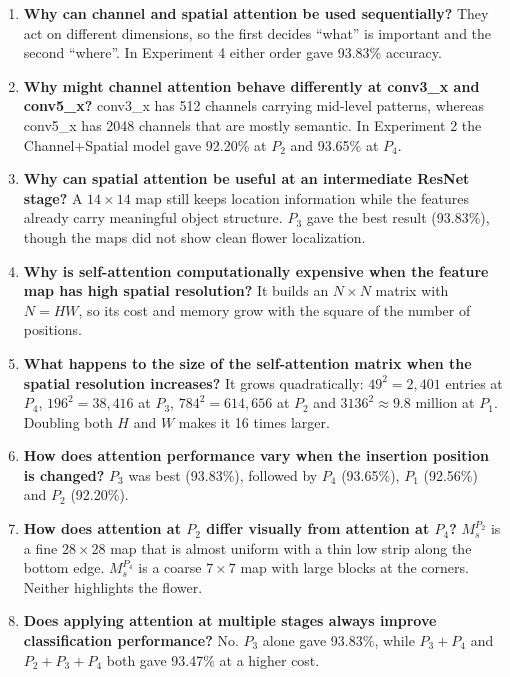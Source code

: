 \documentclass[11pt]{article}
\begin{document}
\begin{enumerate}
\item \textbf{Why can channel and spatial attention be used sequentially?}
They act on different dimensions, so the first decides ``what'' is
important and the second ``where''. In Experiment 4 either order gave
93.83\% accuracy.

\item \textbf{Why might channel attention behave differently at conv3\_x and conv5\_x?}
conv3\_x has 512 channels carrying mid-level patterns, whereas conv5\_x has
2048 channels that are mostly semantic. In Experiment 2 the Channel+Spatial
model gave 92.20\% at $P_2$ and 93.65\% at $P_4$.

\item \textbf{Why can spatial attention be useful at an intermediate ResNet stage?}
A $14\times14$ map still keeps location information while the features
already carry meaningful object structure. $P_3$ gave the best result
(93.83\%), though the maps did not show clean flower localization.

\item \textbf{Why is self-attention computationally expensive when the feature map has high spatial resolution?}
It builds an $N\times N$ matrix with $N=HW$, so its cost and memory grow
with the square of the number of positions.

\item \textbf{What happens to the size of the self-attention matrix when the spatial resolution increases?}
It grows quadratically: $49^2=2{,}401$ entries at $P_4$, $196^2=38{,}416$
at $P_3$, $784^2=614{,}656$ at $P_2$ and $3136^2\approx9.8$ million at $P_1$.
Doubling both $H$ and $W$ makes it 16 times larger.

\item \textbf{How does attention performance vary when the insertion position is changed?}
$P_3$ was best (93.83\%), followed by $P_4$ (93.65\%), $P_1$ (92.56\%) and
$P_2$ (92.20\%).

\item \textbf{How does attention at $P_2$ differ visually from attention at $P_4$?}
$M_s^{P_2}$ is a fine $28\times28$ map that is almost uniform with a thin
low strip along the bottom edge. $M_s^{P_4}$ is a coarse $7\times7$ map with
large blocks at the corners. Neither highlights the flower.

\item \textbf{Does applying attention at multiple stages always improve classification performance?}
No. $P_3$ alone gave 93.83\%, while $P_3+P_4$ and $P_2+P_3+P_4$ both gave
93.47\% at a higher cost.


\end{enumerate}
\end{document}
